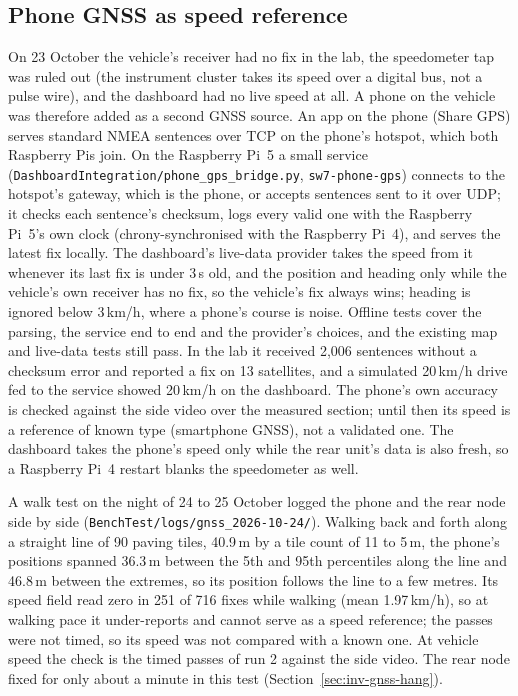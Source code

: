 \subsection{Phone GNSS as speed reference}
\label{sec:impl-phone-gps}

On 23 October the vehicle's receiver had no fix in the lab, the speedometer tap was ruled out (the instrument cluster takes its speed over a digital bus, not a pulse wire), and the dashboard had no live speed at all. A phone on the vehicle was therefore added as a second GNSS source. An app on the phone (Share GPS) serves standard NMEA sentences over TCP on the phone's hotspot, which both Raspberry Pis join. On the Raspberry Pi~5 a small service (\texttt{DashboardIntegration/\allowbreak{}phone\_gps\_bridge.py}, \texttt{sw7-phone-gps}) connects to the hotspot's gateway, which is the phone, or accepts sentences sent to it over UDP; it checks each sentence's checksum, logs every valid one with the Raspberry Pi~5's own clock (chrony-synchronised with the Raspberry Pi~4), and serves the latest fix locally. The dashboard's live-data provider takes the speed from it whenever its last fix is under 3\,s old, and the position and heading only while the vehicle's own receiver has no fix, so the vehicle's fix always wins; heading is ignored below 3\,km/h, where a phone's course is noise. Offline tests cover the parsing, the service end to end and the provider's choices, and the existing map and live-data tests still pass. In the lab it received 2,006 sentences without a checksum error and reported a fix on 13 satellites, and a simulated 20\,km/h drive fed to the service showed 20\,km/h on the dashboard. The phone's own accuracy is checked against the side video over the measured section; until then its speed is a reference of known type (smartphone GNSS), not a validated one. The dashboard takes the phone's speed only while the rear unit's data is also fresh, so a Raspberry Pi~4 restart blanks the speedometer as well.

A walk test on the night of 24 to 25 October logged the phone and the rear node side by side (\texttt{BenchTest/\allowbreak{}logs/\allowbreak{}gnss\_2026-10-24/}). Walking back and forth along a straight line of 90 paving tiles, 40.9\,m by a tile count of 11 to 5\,m, the phone's positions spanned 36.3\,m between the 5th and 95th percentiles along the line and 46.8\,m between the extremes, so its position follows the line to a few metres. Its speed field read zero in 251 of 716 fixes while walking (mean 1.97\,km/h), so at walking pace it under-reports and cannot serve as a speed reference; the passes were not timed, so its speed was not compared with a known one. At vehicle speed the check is the timed passes of run 2 against the side video. The rear node fixed for only about a minute in this test (Section~\ref{sec:inv-gnss-hang}).

